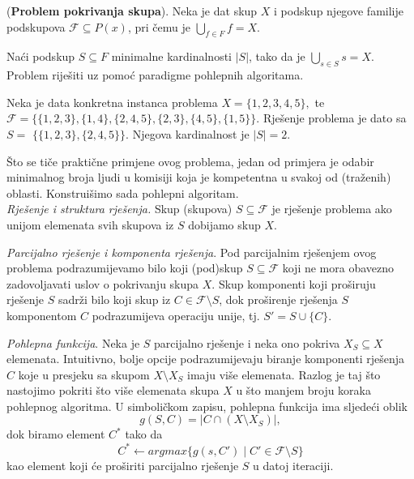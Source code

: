 \begin{example} (\textbf{Problem pokrivanja skupa}). Neka je dat skup $X$ i podskup njegove familije podskupova $\mathcal{F} \subseteq P(x)$, pri čemu je
	$\bigcup_{f \in F} f = X$.
	
	Naći podskup $S \subseteq F$ minimalne kardinalnosti $|S|$, tako da je 
  $\bigcup_{s \in S} s = X$. Problem riješiti uz pomoć paradigme pohlepnih algoritama. 
	
\end{example}

\begin{solution}
	
	Neka je data konkretna instanca problema $X = \{1, 2, 3, 4, 5\},$ te $
	\mathcal{F} = \{\{1, 2, 3\}, \{1, 4\}, \{2, 4, 5\}, \{2, 3\}, \{4, 5\}, \{1, 5\}\}$. 
	Rješenje problema je dato sa $S =$ $ \{\{1, 2, 3\}, \{2, 4, 5\}\}$. Njegova kardinalnost je $|S| = 2$.
	
	Što se tiče praktične primjene ovog problema, jedan od primjera je odabir minimalnog broja ljudi u komisiji  koja je kompetentna u svakoj od (traženih) oblasti. Konstruišimo sada pohlepni algoritam. \\
	
\textit{Rješenje i struktura rješenja.} Skup (skupova) $S \subseteq \mathcal{F}$ je rješenje problema ako unijom elemenata svih skupova iz $S$ dobijamo skup $X$. 

\textit{Parcijalno rješenje i komponenta rješenja}. Pod parcijalnim rješenjem ovog problema podrazumijevamo bilo koji (pod)skup $S \subseteq \mathcal{F}$ koji ne mora obavezno zadovoljavati uslov o pokrivanju skupa $X$.  Skup komponenti koji proširuju rješenje $S$ sadrži bilo koji skup iz $C \in \mathcal{F} \setminus S $, dok proširenje rješenja $S$ komponentom $C$ podrazumijeva operaciju unije, tj. $S' = S \cup \{ C \} $.

\textit{Pohlepna funkcija}. Neka je $S$ parcijalno rješenje i neka ono pokriva $X_S \subseteq X$ elemenata. Intuitivno, bolje opcije podrazumijevaju biranje kompo\-nenti rješenja $C$ koje u presjeku sa skupom $X \setminus X_S$ imaju više elemenata. Razlog je taj što nastojimo pokriti što više elemenata skupa $X$ u što manjem broju koraka pohlepnog algoritma. U simboli\-čkom zapisu, pohlepna funkcija ima sljedeći oblik
$$ g(S, C) = | C \cap ( X \setminus X_S) |,$$
dok biramo element $C^*$ tako da 
$$ C^* \gets argmax \{ g(s, C') \mid C'\in \mathcal{F} \setminus S\} $$
kao element koji će proširiti parcijalno rješenje $S$ u datoj iteraciji.



\end{solution}
